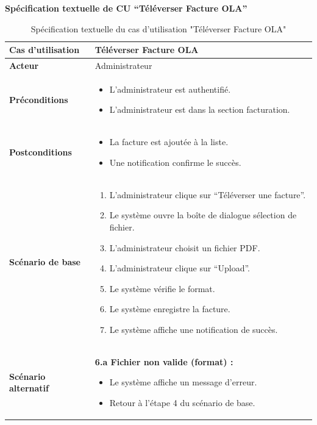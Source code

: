 \documentclass[a4paper,11pt]{report}
\begin{document}
\newpage
\textbf{Spécification textuelle de CU “Téléverser Facture OLA”}

\begin{table}[H]
  \centering
  \renewcommand{\arraystretch}{1.5}
  \caption{Spécification textuelle du cas d'utilisation "Téléverser Facture OLA"}
  \begin{tabularx}{\textwidth}{|l|X|}
    \hline
    \textbf{Cas d'utilisation} & Téléverser Facture OLA \\ \hline
    \textbf{Acteur}            & Administrateur \\ \hline
    \textbf{Préconditions}     & 
      \begin{itemize}[leftmargin=*]
        \item L’administrateur est authentifié.
        \item L'administrateur est dans la section facturation.
      \end{itemize} \\ \hline
    \textbf{Postconditions}    & 
      \begin{itemize}[leftmargin=*]
        \item La facture est ajoutée à la liste.
        \item Une notification confirme le succès.
      \end{itemize} \\ \hline
    \textbf{Scénario de base}  & 
      \begin{enumerate}[leftmargin=*]
        \item L’administrateur clique sur “Téléverser une facture”.
        \item Le système ouvre la boîte de dialogue sélection de fichier.
        \item L'administrateur choisit un fichier PDF.
        \item L'administrateur clique sur “Upload”.
        \item Le système vérifie le format.
        \item Le système enregistre la facture.
        \item Le système affiche une notification de succès.
      \end{enumerate} \\ \hline
    \textbf{Scénario alternatif} & 
      \textbf{6.a Fichier non valide (format) :}
      \begin{itemize}[leftmargin=*]
        \item Le système affiche un message d’erreur.
        \item Retour à l’étape 4 du scénario de base.
      \end{itemize} \\ \hline
  \end{tabularx}
\end{table}
\end{document}
